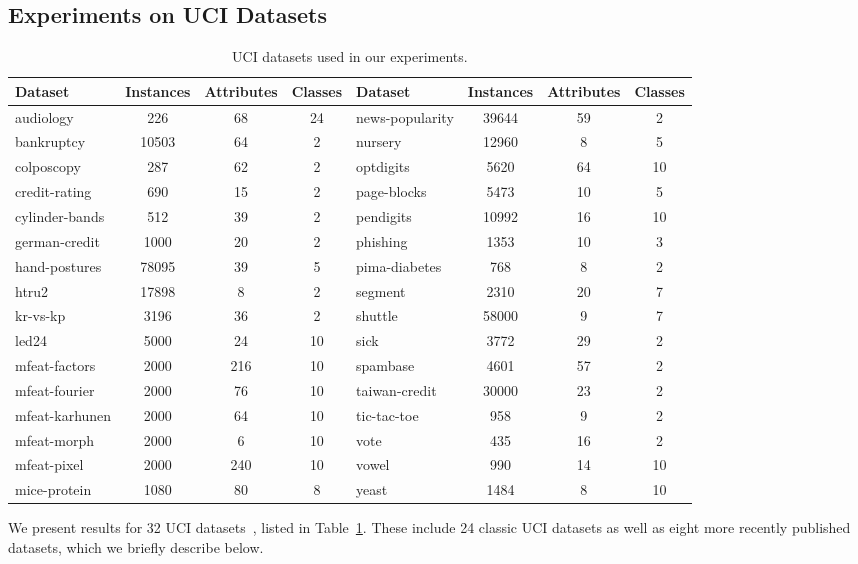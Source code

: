 \documentclass[wcp]{jmlr}
\begin{document}
\subsection{Experiments on UCI Datasets}
\begin{table}[t]
\centering
\scriptsize
\caption{\label{tab:datasets} UCI datasets used in our experiments.}
\begin{tabular}{lccclccc}
\toprule
Dataset             & Instances & Attributes & Classes & Dataset & Instances & Attributes & Classes\\
\midrule
audiology       & 226   & 68  & 24 & news-popularity & 39644 & 59  & 2 \\
bankruptcy      & 10503 & 64  & 2  & nursery         & 12960 & 8   & 5 \\
colposcopy      & 287   & 62  & 2  & optdigits       & 5620  & 64  & 10\\
credit-rating   & 690   & 15  & 2  & page-blocks     & 5473  & 10  & 5 \\
cylinder-bands  & 512   & 39  & 2  & pendigits       & 10992 & 16  & 10\\
german-credit   & 1000  & 20  & 2  & phishing        & 1353  & 10  & 3 \\
hand-postures   & 78095 & 39  & 5  & pima-diabetes   & 768   & 8   & 2 \\
htru2           & 17898 & 8   & 2  & segment         & 2310  & 20  & 7 \\
kr-vs-kp        & 3196  & 36  & 2  & shuttle         & 58000 & 9   & 7 \\
led24           & 5000  & 24  & 10 & sick            & 3772  & 29  & 2 \\
mfeat-factors   & 2000  & 216 & 10 & spambase        & 4601  & 57  & 2 \\
mfeat-fourier   & 2000  & 76  & 10 & taiwan-credit   & 30000 & 23  & 2 \\
mfeat-karhunen  & 2000  & 64  & 10 & tic-tac-toe     & 958   & 9   & 2 \\
mfeat-morph     & 2000  & 6   & 10 & vote            & 435   & 16  & 2 \\
mfeat-pixel     & 2000  & 240 & 10 & vowel           & 990   & 14  & 10\\
mice-protein    & 1080  & 80  & 8  & yeast           & 1484  & 8   & 10\\
\bottomrule
\end{tabular}
\end{table}

We present results for 32 UCI datasets~\citep{Lichman2013}, listed in Table~\ref{tab:datasets}. These include 24 classic UCI datasets as well as eight more recently published datasets, which we briefly describe below.
\end{document}
